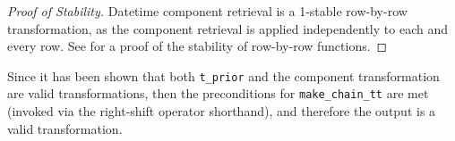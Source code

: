 \documentclass{article}
\begin{document}
\begin{proof}[Proof of Stability]
    Datetime component retrieval is a 1-stable row-by-row transformation,
    as the component retrieval is applied independently to each and every row.
    See  for a proof of the stability of row-by-row functions.
\end{proof}

Since it has been shown that both \texttt{t\_prior} and the component transformation are valid transformations,
then the preconditions for \texttt{make\_chain\_tt} are met (invoked via the right-shift operator shorthand),
and therefore the output is a valid transformation.
\end{document}
